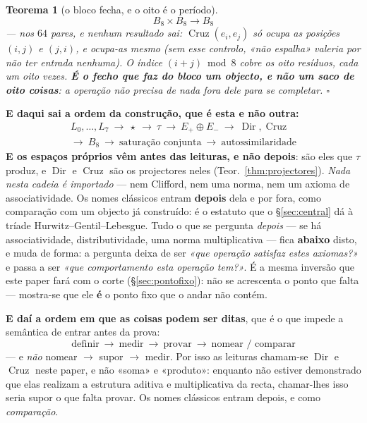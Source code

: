 \documentclass[11pt,a4paper]{article}
\newtheorem{teorema}{Teorema}
\begin{document}
\begin{teorema}[o bloco fecha, e o oito é o período]\label{thm:bloco}
\[
\boxed{\;B_8\times B_8\longrightarrow B_8\;}
\]
--- nos $64$ pares, e nenhum resultado sai: $\operatorname{Cruz}(e_i,e_j)$ só ocupa as
posições $(i,j)$ e $(j,i)$, e ocupa-as mesmo (sem esse controlo, «não espalha» valeria por
não ter entrada nenhuma). O índice $(i+j)\bmod 8$ cobre os oito resíduos, cada um oito
vezes. \textbf{É o fecho que faz do bloco um objecto, e não um saco de oito coisas}: a
operação não precisa de nada fora dele para se completar. $\square$
\end{teorema}

\medskip
\noindent\textbf{E daqui sai a ordem da construção, que é esta e não outra:}
\[
\boxed{\;\begin{gathered}
L_0,\ldots,L_7
\ \longrightarrow\ \star
\ \longrightarrow\ \tau
\ \longrightarrow\ E_{+}\oplus E_{-}
\ \longrightarrow\ \operatorname{Dir},\operatorname{Cruz}\\[3pt]
\longrightarrow\ B_8
\ \longrightarrow\ \text{saturação conjunta}
\ \longrightarrow\ \text{autossimilaridade}
\end{gathered}\;}
\]
\textbf{E os espaços próprios vêm antes das leituras, e não depois}: são eles que $\tau$
produz, e $\operatorname{Dir}$ e $\operatorname{Cruz}$ são os projectores neles
(Teor.~\ref{thm:projectores}). \emph{Nada nesta cadeia é importado} --- nem Clifford, nem
uma norma, nem um axioma de associatividade. Os nomes clássicos entram
\textbf{depois} dela e por fora, como comparação com um objecto já construído: é o
estatuto que o \S\ref{sec:central} dá à tríade Hurwitz--Gentil--Lebesgue.
Tudo o que se pergunta \emph{depois} --- se há associatividade, distributividade, uma
norma multiplicativa --- fica \textbf{abaixo} disto, e muda de forma: a pergunta deixa de
ser \emph{«que operação satisfaz estes axiomas?»} e passa a ser \emph{«que comportamento
esta operação tem?»}. É a mesma inversão que este paper fará com o corte
(\S\ref{sec:pontofixo}): não se acrescenta o ponto que falta --- mostra-se que ele
\textbf{é} o ponto fixo que o andar não contém.

\medskip
\noindent\textbf{E daí a ordem em que as coisas podem ser ditas}, que é o que impede a
semântica de entrar antes da prova:
\[
\boxed{\;\text{definir}\ \to\ \text{medir}\ \to\ \text{provar}\ \to\
\text{nomear / comparar}\;}
\]
--- e \emph{não} nomear $\to$ supor $\to$ medir. Por isso as leituras chamam-se
$\operatorname{Dir}$ e $\operatorname{Cruz}$ neste paper, e não «soma» e «produto»:
enquanto não estiver demonstrado que elas realizam a estrutura aditiva e multiplicativa
da recta, chamar-lhes isso seria supor o que falta provar. Os nomes clássicos entram
depois, e como \emph{comparação}.
\end{document}
